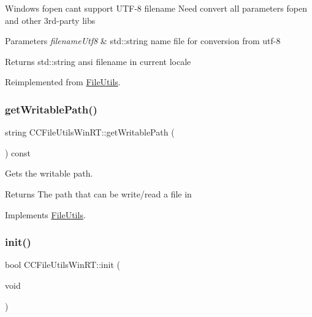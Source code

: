 Windows fopen can\textquotesingle{}t support U\+T\+F-\/8 filename Need convert all parameters fopen and other 3rd-\/party libs


\begin{DoxyParams}{Parameters}
{\em filename\+Utf8} & std\+::string name file for conversion from utf-\/8 \\
\hline
\end{DoxyParams}
\begin{DoxyReturn}{Returns}
std\+::string ansi filename in current locale 
\end{DoxyReturn}


Reimplemented from \hyperlink{classFileUtils_a318996e1e3cc1ff7463dea9159d7e7be}{File\+Utils}.

\mbox{\label{classCCFileUtilsWinRT_a546c4b1920e4484929a0d3cffe554720}} 
\subsubsection{\texorpdfstring{get\+Writable\+Path()}{getWritablePath()}}
{\footnotesize\ttfamily string C\+C\+File\+Utils\+Win\+R\+T\+::get\+Writable\+Path (\begin{DoxyParamCaption}{ }\end{DoxyParamCaption}) const\hspace{0.3cm}{\ttfamily [virtual]}}

Gets the writable path. \begin{DoxyReturn}{Returns}
The path that can be write/read a file in 
\end{DoxyReturn}


Implements \hyperlink{classFileUtils_aab14c8d4e292f7a1e9b2b2908d02a0ed}{File\+Utils}.

\mbox{\label{classCCFileUtilsWinRT_a1f2d5c30d599ab4490a2dead634f7459}} 
\subsubsection{\texorpdfstring{init()}{init()}}
{\footnotesize\ttfamily bool C\+C\+File\+Utils\+Win\+R\+T\+::init (\begin{DoxyParamCaption}\item[{void}]{ }\end{DoxyParamCaption})\hspace{0.3cm}{\ttfamily [virtual]}}

